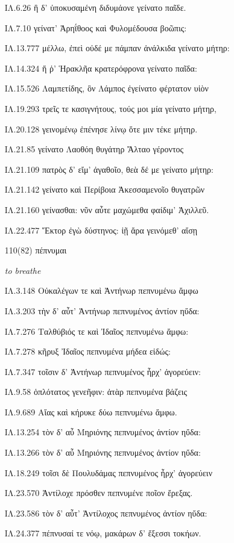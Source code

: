 \begin{enumerate}
{ΙΛ.6.26 ἣ δ' ὑποκυσαμένη διδυμάονε γείνατο παῖδε.

ΙΛ.7.10 γείνατ' Ἀρηΐθοος καὶ Φυλομέδουσα βοῶπις:

ΙΛ.13.777 μέλλω, ἐπεὶ οὐδέ με πάμπαν ἀνάλκιδα γείνατο μήτηρ:

ΙΛ.14.324 ἥ ῥ' Ἡρακλῆα κρατερόφρονα γείνατο παῖδα:

ΙΛ.15.526 Λαμπετίδης, ὃν Λάμπος ἐγείνατο φέρτατον υἱὸν

ΙΛ.19.293 τρεῖς τε κασιγνήτους, τούς μοι μία γείνατο μήτηρ,

ΙΛ.20.128 γεινομένῳ ἐπένησε λίνῳ ὅτε μιν τέκε μήτηρ.

ΙΛ.21.85 γείνατο Λαοθόη θυγάτηρ Ἄλταο γέροντος

ΙΛ.21.109 πατρὸς δ' εἴμ' ἀγαθοῖο, θεὰ δέ με γείνατο μήτηρ:

ΙΛ.21.142 γείνατο καὶ Περίβοια Ἀκεσσαμενοῖο θυγατρῶν

ΙΛ.21.160 γείνασθαι: νῦν αὖτε μαχώμεθα φαίδιμ' Ἀχιλλεῦ.

ΙΛ.22.477 Ἕκτορ ἐγὼ δύστηνος: ἰῇ ἄρα γεινόμεθ' αἴσῃ

}

\clearpage
\item[\large 110(82)]{\large \g πέπνυμαι}

\hspace{0.2cm} \textit{ to breathe }

{\g
ΙΛ.3.148 Οὐκαλέγων τε καὶ Ἀντήνωρ πεπνυμένω ἄμφω

ΙΛ.3.203 τὴν δ' αὖτ' Ἀντήνωρ πεπνυμένος ἀντίον ηὔδα:

ΙΛ.7.276 Ταλθύβιός τε καὶ Ἰδαῖος πεπνυμένω ἄμφω:

ΙΛ.7.278 κῆρυξ Ἰδαῖος πεπνυμένα μήδεα εἰδώς:

ΙΛ.7.347 τοῖσιν δ' Ἀντήνωρ πεπνυμένος ἦρχ' ἀγορεύειν:

ΙΛ.9.58 ὁπλότατος γενεῆφιν: ἀτὰρ πεπνυμένα βάζεις

ΙΛ.9.689 Αἴας καὶ κήρυκε δύω πεπνυμένω ἄμφω.

ΙΛ.13.254 τὸν δ' αὖ Μηριόνης πεπνυμένος ἀντίον ηὔδα:

ΙΛ.13.266 τὸν δ' αὖ Μηριόνης πεπνυμένος ἀντίον ηὔδα:

ΙΛ.18.249 τοῖσι δὲ Πουλυδάμας πεπνυμένος ἦρχ' ἀγορεύειν

ΙΛ.23.570 Ἀντίλοχε πρόσθεν πεπνυμένε ποῖον ἔρεξας.

ΙΛ.23.586 τὸν δ' αὖτ' Ἀντίλοχος πεπνυμένος ἀντίον ηὔδα:

ΙΛ.24.377 πέπνυσαί τε νόῳ, μακάρων δ' ἔξεσσι τοκήων.

}
\end{enumerate}
